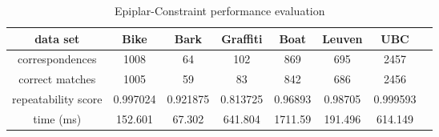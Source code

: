 \begin{table}[H]
  \begin{tabular}{| c || c | c | c | c | c | c | c |}
      \hline
      data set & Bike & Bark & Graffiti & Boat & Leuven & UBC \\ \hline \hline
      correspondences & 1008 & 64 & 102 & 869 & 695 & 2457 \\ \hline
      correct matches & 1005 & 59 & 83 & 842 & 686 & 2456 \\ \hline
      repeatability score & 0.997024 & 0.921875 & 0.813725 & 0.96893 & 0.98705 & 0.999593 \\ \hline
      time (ms) & 152.601 & 67.302 & 641.804 & 1711.59 & 191.496 & 614.149 \\ \hline
  \end{tabular}
  \caption{Epiplar-Constraint performance evaluation} \label{tab:epipolar_matching_eval}
\end{table}

